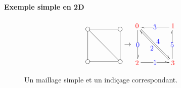 \documentclass[]{article}
\begin{document}
\paragraph{Exemple simple en 2D}
\begin{figure}[H]
	\[\begin{aligned}[c]
			\entrymodifiers={+[o][F]}
			\renewcommand{\labelstyle}{\textstyle}
			\xymatrix@=4em @L=.25ex{
			{}
			\ar @^{-} [d]
			\ar @^{-} [dr]
			 & {}
			\ar @^{-} [l]
			\\ {}
			\ar @^{-} [r]
			 & {}
			\ar @^{-} [u]
			}
		\end{aligned}\rightarrow\begin{aligned}[c]
			\xymatrix@=4em @L=.25ex{
			{\color{red}0}
			\ar @<.25ex> @^{->} [d] |{\color{blue}0}
			\ar @<.25ex> @^{->} [dr] ^{\color{blue}4}
			 & {\color{red}1}
			\ar @<.25ex> @^{->} [l] |{\color{blue}3}
			\\ {\color{red}2}
			\ar @<.25ex> @^{->} [r] |{\color{blue}1}
			 & {\color{red}3}
			\ar @<.25ex> @^{->} [ul] ^{\color{blue}2}
			\ar @<.25ex> @^{->} [u] |{\color{blue}5}
			}
		\end{aligned}\]
	\caption{Un maillage simple et un indiçage correspondant.}
	\label{maillage_simple}
\end{figure}
\end{document}
